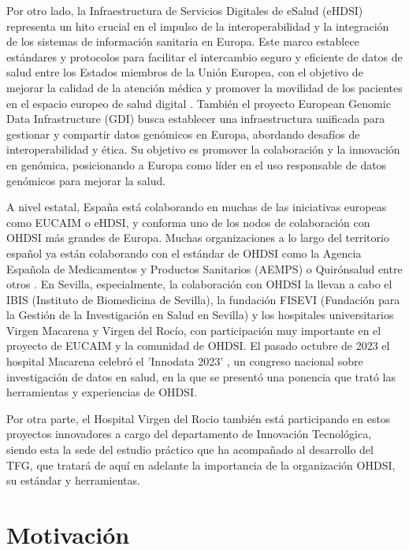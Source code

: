 Por otro lado, la Infraestructura de Servicios Digitales de eSalud (eHDSI) \cite{DHE2023eHDSI} representa un hito crucial en el impulso de la interoperabilidad y la integración de los sistemas de información sanitaria en Europa. Este marco establece estándares y protocolos para facilitar el intercambio seguro y eficiente de datos de salud entre los Estados miembros de la Unión Europea, con el objetivo de mejorar la calidad de la atención médica y promover la movilidad de los pacientes en el espacio europeo de salud digital \cite{EU2023Servicios}. También el proyecto European Genomic Data Infrastructure (GDI) \cite{GDI2022GDI} busca establecer una infraestructura unificada para gestionar y compartir datos genómicos en Europa, abordando desafíos de interoperabilidad y ética. Su objetivo es promover la colaboración y la innovación en genómica, posicionando a Europa como líder en el uso responsable de datos genómicos para mejorar la salud.

A nivel estatal, España está colaborando en muchas de las iniciativas europeas como EUCAIM o eHDSI, y conforma uno de los nodos de colaboración con OHDSI más grandes de Europa. Muchas organizaciones a lo largo del territorio español ya están colaborando con el estándar de OHDSI como la Agencia Española de Medicamentos y Productos Sanitarios (AEMPS) o Quirónsalud entre otros \cite{ohdsiSpain}. En Sevilla, especialmente, la colaboración con OHDSI la llevan a cabo el IBIS (Instituto de Biomedicina de Sevilla), la fundación FISEVI (Fundación para la Gestión de la Investigación en Salud en Sevilla) y los hospitales universitarios Virgen Macarena y Virgen del Rocío, con participación muy importante en el proyecto de EUCAIM y la comunidad de OHDSI. El pasado octubre de 2023 el hospital Macarena celebró el 'Innodata 2023' \cite{HUVM2023INNODATA}, un congreso nacional sobre investigación de datos en salud, en la que se presentó una ponencia que trató las herramientas y experiencias de OHDSI. 

Por otra parte, el Hospital Virgen del Rocio también está participando en estos proyectos innovadores a cargo del departamento de Innovación Tecnológica, siendo esta la sede del estudio práctico que ha acompañado al desarrollo del TFG, que tratará de aquí en adelante la importancia de la organización OHDSI, su estándar y herramientas.


\section{Motivación} \label{sec:01Motivacion}

